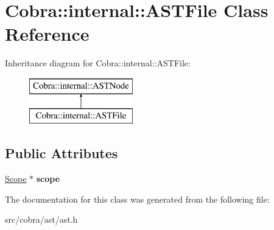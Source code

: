\hypertarget{class_cobra_1_1internal_1_1_a_s_t_file}{\section{Cobra\+:\+:internal\+:\+:A\+S\+T\+File Class Reference}
\label{class_cobra_1_1internal_1_1_a_s_t_file}
}
Inheritance diagram for Cobra\+:\+:internal\+:\+:A\+S\+T\+File\+:\begin{figure}[H]
\begin{center}
\leavevmode
\includegraphics[height=2.000000cm]{class_cobra_1_1internal_1_1_a_s_t_file}
\end{center}
\end{figure}
\subsection*{Public Attributes}
\begin{DoxyCompactItemize}
\item 
\hypertarget{class_cobra_1_1internal_1_1_a_s_t_file_affc71f3bf233586e51d4c5b0aa938962}{\hyperlink{class_cobra_1_1internal_1_1_scope}{Scope} $\ast$ {\bfseries scope}}\label{class_cobra_1_1internal_1_1_a_s_t_file_affc71f3bf233586e51d4c5b0aa938962}

\end{DoxyCompactItemize}


The documentation for this class was generated from the following file\+:\begin{DoxyCompactItemize}
\item 
src/cobra/ast/ast.\+h\end{DoxyCompactItemize}
